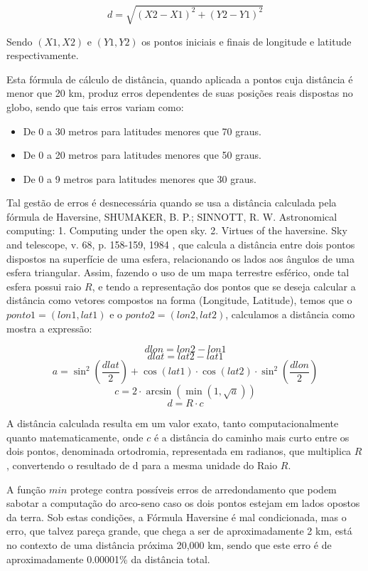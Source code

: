\[d = \sqrt{(X2 - X1)^2 + (Y2 - Y1)^2}\]

Sendo \((X1, X2)\) e \((Y1,Y2)\) os pontos iniciais e finais de longitude e latitude respectivamente.

Esta fórmula de cálculo de distância, quando aplicada a pontos cuja distância é menor que 20 km, produz erros dependentes de suas posições reais dispostas no globo, sendo que tais erros variam como:
\begin{itemize}
\item De 0 a 30 metros para latitudes menores que 70 graus.
\item De 0 a 20 metros para latitudes menores que 50 graus. 
\item De 0 a 9 metros para latitudes menores que 30 graus.
\end{itemize}

Tal gestão de erros é desnecessária quando se usa a distância calculada pela fórmula de Haversine, SHUMAKER, B. P.; SINNOTT, R. W. Astronomical computing: 1. Computing under the open sky. 2. Virtues of the haversine. Sky and telescope, v. 68, p. 158-159, 1984 \cite{shumaker1984astronomical}, que calcula a distância entre dois pontos dispostos na superfície de uma esfera, relacionando os lados aos ângulos de uma esfera triangular. Assim, fazendo o uso de um mapa terrestre esférico, onde tal esfera possui raio \(R\), e tendo a representação dos pontos que se deseja calcular a distância como vetores compostos na forma (Longitude, Latitude), temos que o \(ponto1 = (lon1,lat1)\) e o \(ponto2 = (lon2,lat2)\), calculamos a distância como mostra a expressão:

\[dlon = lon2 - lon1\]
\[dlat = lat2 - lat1\]
\[a = \sin^2\left(\frac{dlat}{2}\right) + \cos(lat1) \cdot \cos(lat2) \cdot \sin^2\left(\frac{dlon}{2}\right)\]
\[c = 2 \cdot \arcsin(\min(1,\sqrt{a}))\]
\[d = R \cdot c\]

A distância calculada resulta em um valor exato, tanto computacionalmente quanto matematicamente, onde \(c\) é a distância do caminho mais curto entre os dois pontos, denominada ortodromia, representada em radianos, que multiplica \(R\), convertendo o resultado de d para a mesma unidade do Raio \(R\). 

A função \(min\) protege contra possíveis erros de arredondamento que podem sabotar a computação do arco-seno caso os dois pontos estejam em lados opostos da terra. Sob estas condições, a Fórmula Haversine é mal condicionada, mas o erro, que talvez pareça grande, que chega a ser de aproximadamente 2 km, está no contexto de uma distância próxima 20,000 km, sendo que este erro é de aproximadamente 0.00001\% da distância total.

